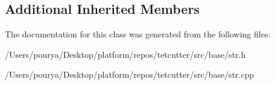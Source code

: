 \subsection*{Additional Inherited Members}


The documentation for this class was generated from the following files\+:\begin{DoxyCompactItemize}
\item 
/\+Users/pourya/\+Desktop/platform/repos/tetcutter/src/base/str.\+h\item 
/\+Users/pourya/\+Desktop/platform/repos/tetcutter/src/base/str.\+cpp\end{DoxyCompactItemize}
